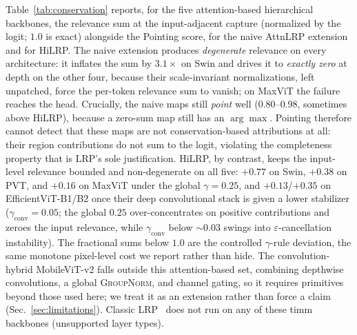 \documentclass[lettersize,journal]{IEEEtran}
\begin{document}
Table~\ref{tab:conservation} reports, for the five attention-based hierarchical backbones, the relevance sum at the input-adjacent capture (normalized by the logit; $1.0$ is exact) alongside the Pointing score, for the naive AttnLRP extension and for HiLRP. The naive extension produces \emph{degenerate} relevance on every architecture: it inflates the sum by $3.1\times$ on Swin and drives it to \emph{exactly zero} at depth on the other four, because their scale-invariant normalizations, left unpatched, force the per-token relevance sum to vanish; on MaxViT the failure reaches the head. Crucially, the naive maps still \emph{point} well ($0.80$--$0.98$, sometimes above HiLRP), because a zero-sum map still has an $\arg\max$. Pointing therefore cannot detect that these maps are not conservation-based attributions at all: their region contributions do not sum to the logit, violating the completeness property that is LRP's sole justification. HiLRP, by contrast, keeps the input-level relevance bounded and non-degenerate on all five: $+0.77$ on Swin, $+0.38$ on PVT, and $+0.16$ on MaxViT under the global $\gamma{=}0.25$, and $+0.13$/$+0.35$ on EfficientViT-B1/B2 once their deep convolutional stack is given a lower stabilizer ($\gamma_{\text{conv}}{=}0.05$; the global $0.25$ over-concentrates on positive contributions and zeroes the input relevance, while $\gamma_{\text{conv}}$ below $\sim0.03$ swings into $\varepsilon$-cancellation instability). The fractional sums below $1.0$ are the controlled $\gamma$-rule deviation, the same monotone pixel-level cost we report rather than hide. The convolution-hybrid MobileViT-v2 falls outside this attention-based set, combining depthwise convolutions, a global \textsc{GroupNorm}, and channel gating, so it requires primitives beyond those used here; we treat it as an extension rather than force a claim (Sec.~\ref{sec:limitations}). Classic LRP~\cite{bach2015lrp} does not run on any of these timm backbones (unsupported layer types).
\end{document}

